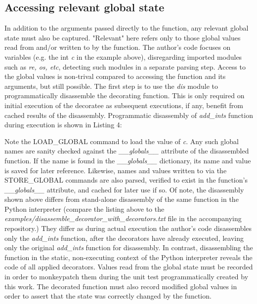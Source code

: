 %
\subsection{Accessing relevant global state}\label{sec:approach-internal-2}

In addition to the arguments passed directly to the function, any relevant 
global state must also be captured. "Relevant" here refers only to those 
global values read from and/or written to by the function.
The author's code focuses on variables (e.g. the int \textit{c} in the example above), 
disregarding imported modules such as \textit{re, os, etc}, detecting such
modules in a separate parsing step.
Access to the global values is non-trival compared to accessing the function 
and its arguments, but still possible.  The first step is to use the \textit{dis}
module to programmatically disassemble the decorating function.  This is only 
required on initial execution of the decoratee as subsequent executions, if any, 
benefit from cached results of the disassembly.
Programmatic disassembly of \textit{add\_ints} function during execution is shown
in Listing 4:



Note the LOAD\_GLOBAL command to load the value of \textit{c}.  Any such global names 
are sanity checked against the \textit{\_\_globals\_\_} attribute of the 
disassembled function.
%
If the name is found in the \textit{\_\_globals\_\_} dictionary, its name and 
value is saved for later reference.  Likewise, names and values written to via 
the STORE\_GLOBAL commands are also parsed, verified to exist in the function's
 \textit{\_\_globals\_\_} attribute, and cached for later use if so.
%
Of note, the disassembly shown above differs from stand-alone disassembly of 
the same function in the Python interpreter (compare the listing above to the
\textit{examples/disassemble\_decorator\_with\_decorators.txt} file in the 
 accompanying repository.)
They differ as during actual execution the author's code
 disassembles only the \textit{add\_ints} function, after the decorators
  have already executed, leaving only the original  \textit{add\_ints}
  function for disassembly.
In contrast, disassembling the function in the static, non-executing context of
the Python interpreter reveals the code of all applied decorators.  
%
Values read from the global state must be recorded 
in order to monkeypatch them during the unit test programmatically 
created by this work.
%
The decorated function must also record modified global values in
order to assert that the state was correctly changed by the function.

